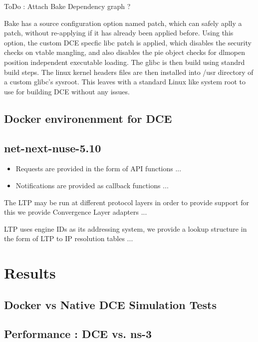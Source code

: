 \documentclass{sig-alternate}
\begin{document}
ToDo : Attach Bake Dependency graph ? 

Bake has a source configuration option named patch, which can safely aplly a patch, without re-applying if it has already been applied before.
Using this option, the custom DCE specfic libc patch is applied, which disables the security checks on vtable mangling, and also disables the 
pie object checks for dlmopen position independent executable loading. The glibc is then build using standrd build steps. The linux kernel headers
files are then installed into /usr directory of a custom glibc's sysroot. This leaves with a standard Linux like system root to use for building 
DCE without any issues. 


\subsection{Docker environenment for DCE}

\subsection{net-next-nuse-5.10}


\begin{itemize}
 \item Requests are provided in the form of API functions ...
 \item Notifications are provided as callback functions ...
\end{itemize}

The LTP may be run at different protocol layers in order to provide support for this
we provide Convergence Layer adapters ...

LTP uses engine IDs as its addressing system, we provide a lookup structure in the form of LTP to IP resolution tables ...


\section{Results}

\subsection{Docker vs Native DCE Simulation Tests}

\subsection{Performance : DCE vs. ns-3}
\end{document}
